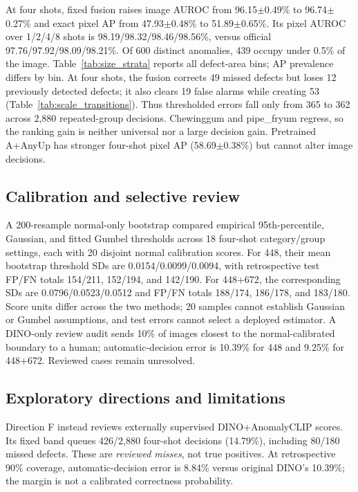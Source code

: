 \documentclass[times,10pt,twocolumn,letterpaper]{article}
\begin{document}
At four shots, fixed fusion raises image AUROC from 96.15$\pm$0.49\% to 96.74$\pm$0.27\% and exact pixel AP from 47.93$\pm$0.48\% to 51.89$\pm$0.65\%. Its pixel AUROC over 1/2/4/8 shots is 98.19/98.32/98.46/98.56\%, versus official 97.76/97.92/98.09/98.21\%. Of 600 distinct anomalies, 439 occupy under 0.5\% of the image. Table~\ref{tab:size_strata} reports all defect-area bins; AP prevalence differs by bin. At four shots, the fusion corrects 49 missed defects but loses 12 previously detected defects; it also clears 19 false alarms while creating 53 (Table~\ref{tab:scale_transitions}). Thus thresholded errors fall only from 365 to 362 across 2,880 repeated-group decisions. Chewinggum and pipe\_fryum regress, so the ranking gain is neither universal nor a large decision gain. Pretrained A+AnyUp has stronger four-shot pixel AP (58.69$\pm$0.38\%) but cannot alter image decisions.

\subsection{Calibration and selective review}
A 200-resample normal-only bootstrap compared empirical 95th-percentile, Gaussian, and fitted Gumbel thresholds across 18 four-shot category/group settings, each with 20 disjoint normal calibration scores. For 448, their mean bootstrap threshold SDs are 0.0154/0.0099/0.0094, with retrospective test FP/FN totals 154/211, 152/194, and 142/190. For 448+672, the corresponding SDs are 0.0796/0.0523/0.0512 and FP/FN totals 188/174, 186/178, and 183/180. Score units differ across the two methods; 20 samples cannot establish Gaussian or Gumbel assumptions, and test errors cannot select a deployed estimator. A DINO-only review audit sends 10\% of images closest to the normal-calibrated boundary to a human; automatic-decision error is 10.39\% for 448 and 9.25\% for 448+672. Reviewed cases remain unresolved.

\subsection{Exploratory directions and limitations}
Direction F instead reviews externally supervised DINO+AnomalyCLIP scores. Its fixed band queues 426/2,880 four-shot decisions (14.79\%), including 80/180 missed defects. These are \emph{reviewed misses}, not true positives. At retrospective 90\% coverage, automatic-decision error is 8.84\% versus original DINO's 10.39\%; the margin is not a calibrated correctness probability.
\end{document}
